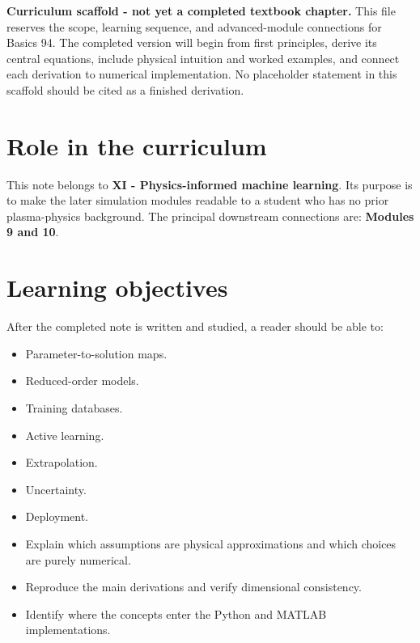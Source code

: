 \documentclass[11pt]{article}
\begin{document}

\begin{overviewbox}
\textbf{Curriculum scaffold - not yet a completed textbook chapter.} This file reserves the scope, learning sequence, and advanced-module connections for Basics 94. The completed version will begin from first principles, derive its central equations, include physical intuition and worked examples, and connect each derivation to numerical implementation. No placeholder statement in this scaffold should be cited as a finished derivation.
\end{overviewbox}

\ProjectTOC

\section{Role in the curriculum}
This note belongs to \textbf{XI - Physics-informed machine learning}. Its purpose is to make the later simulation modules readable to a student who has no prior plasma-physics background. The principal downstream connections are: \textbf{Modules 9 and 10}.

\section{Learning objectives}
After the completed note is written and studied, a reader should be able to:
\begin{itemize}[leftmargin=1.6em]
\item Parameter-to-solution maps.
\item Reduced-order models.
\item Training databases.
\item Active learning.
\item Extrapolation.
\item Uncertainty.
\item Deployment.
\item Explain which assumptions are physical approximations and which choices are purely numerical.
\item Reproduce the main derivations and verify dimensional consistency.
\item Identify where the concepts enter the Python and MATLAB implementations.
\end{itemize}
\end{document}
